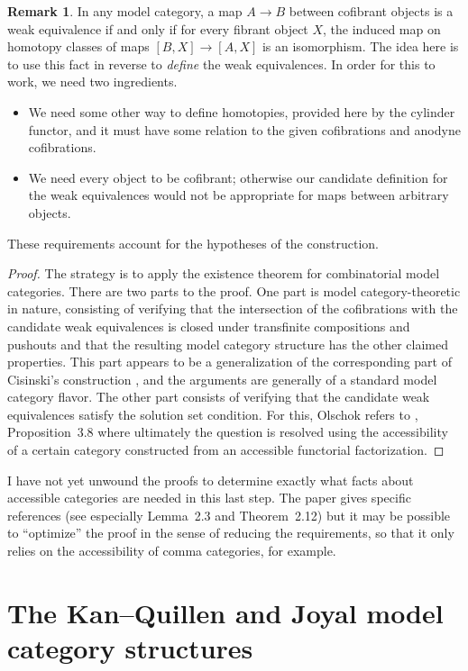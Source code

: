 \documentclass{article}
\theoremstyle{definition}
\newtheorem{remark}[definition]{Remark}
\theoremstyle{plain}
\newcommand{\KQ}{Kan--Quillen}
\begin{document}
\begin{remark}
  In any model category, a map $A \to B$ between cofibrant objects is a weak equivalence if and only if for every fibrant object $X$, the induced map on homotopy classes of maps $[B, X] \to [A, X]$ is an isomorphism.
  The idea here is to use this fact in reverse to \emph{define} the weak equivalences.
  In order for this to work, we need two ingredients.
  \begin{itemize}
  \item We need some other way to define homotopies, provided here by the cylinder functor, and it must have some relation to the given cofibrations and anodyne cofibrations.
  \item We need every object to be cofibrant; otherwise our candidate definition for the weak equivalences would not be appropriate for maps between arbitrary objects.
  \end{itemize}
  These requirements account for the hypotheses of the construction.
\end{remark}

\begin{proof}
  The strategy is to apply the existence theorem for combinatorial model categories.
  There are two parts to the proof.
  One part is model category-theoretic in nature, consisting of verifying that the intersection of the cofibrations with the candidate weak equivalences is closed under transfinite compositions and pushouts and that the resulting model category structure has the other claimed properties.
  This part appears to be a generalization of the corresponding part of Cisinski's construction \cite{C06}, and the arguments are generally of a standard model category flavor.
  The other part consists of verifying that the candidate weak equivalences satisfy the solution set condition.
  For this, Olschok refers to \cite{R}, Proposition~3.8 where ultimately the question is resolved using the accessibility of a certain category constructed from an accessible functorial factorization.
\end{proof}

I have not yet unwound the proofs to determine exactly what facts about accessible categories are needed in this last step.
The paper \cite{O} gives specific references (see especially Lemma~2.3 and Theorem~2.12) but it may be possible to ``optimize'' the proof in the sense of reducing the requirements, so that it only relies on the accessibility of comma categories, for example.

\section{The \KQ{} and Joyal model category structures}
\end{document}
